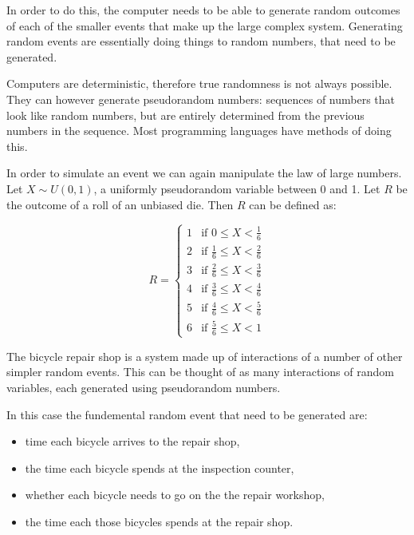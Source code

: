 In order to do this, the computer needs to be able to generate random outcomes
of each of the smaller events that make up the large complex system. Generating
random events are essentially doing things to random numbers, that need to be
generated.

Computers are deterministic, therefore true randomness is not always possible.
They can however generate pseudorandom numbers: sequences of numbers that look
like random numbers, but are entirely determined from the
previous numbers in the sequence. Most programming languages have methods of
doing this.

In order to simulate an event we can again manipulate the law of large numbers.
Let $X \sim U(0, 1)$, a uniformly pseudorandom variable between 0 and 1.
Let $R$ be the outcome of a roll of an unbiased die. Then $R$ can be defined as:

\begin{equation}
R =
  \begin{cases}
    1 & \text{if } 0 \leq X < \frac{1}{6}\\
    2 & \text{if } \frac{1}{6} \leq X < \frac{2}{6}\\
    3 & \text{if } \frac{2}{6} \leq X < \frac{3}{6}\\
    4 & \text{if } \frac{3}{6} \leq X < \frac{4}{6}\\
    5 & \text{if } \frac{4}{6} \leq X < \frac{5}{6}\\
    6 & \text{if } \frac{5}{6} \leq X < 1
  \end{cases}
\end{equation}

The bicycle repair shop is a system made up of interactions of a number of other
simpler random events. This can be thought of as many interactions of random
variables, each generated using pseudorandom numbers.

In this case the fundemental random event that need to be generated are:
\begin{itemize}
  \item time each bicycle arrives to the repair shop,
  \item the time each bicycle spends at the inspection counter,
  \item whether each bicycle needs to go on the the repair workshop,
  \item the time each those bicycles spends at the repair shop.
\end{itemize}

